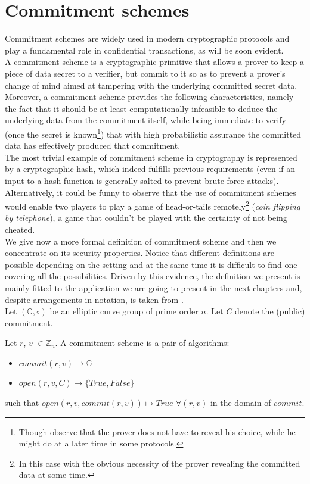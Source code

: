 \section{Commitment schemes}
\label{sect:commitment_schemes}
Commitment schemes are widely used in modern cryptographic protocols and play a fundamental role in confidential transactions, as will be soon evident.\\
A commitment scheme is a cryptographic primitive that allows a prover to keep a piece of data secret to a verifier, but commit to it so as to prevent a prover's change of mind aimed at tampering with the underlying committed secret data. Moreover, a commitment scheme provides the following characteristics, namely the fact that it should be at least computationally infeasible to deduce the underlying data from the commitment itself, while being immediate to verify (once the secret is known\footnote{Though observe that the prover does not have to reveal his choice, while he might do at a later time in some protocols.}) that with high probabilistic assurance the committed data has effectively produced that commitment.\\
The most trivial example of commitment scheme in cryptography is represented by a cryptographic hash, which indeed fulfills previous requirements (even if an input to a hash function is generally salted to prevent brute-force attacks). Alternatively, it could be funny to observe that the use of commitment schemes would enable two players to play a game of head-or-tails remotely\footnote{In this case with the obvious necessity of the prover revealing the committed data at some time.} (\textit{coin flipping by telephone}), a game that couldn't be played with the certainty of not being cheated.\\
We give now a more formal definition of commitment scheme and then we concentrate on its security properties. Notice that different definitions are possible depending on the setting and at the same time it is difficult to find one covering all the possibilities. Driven by this evidence, the definition we present is mainly fitted to the application we are going to present in the next chapters and, despite arrangements in notation, is taken from \cite{PoeMW}.\\
Let $(\mathbb{G}, \circ)$ be an elliptic curve group of prime order $n$. Let $C$ denote the (public) commitment.
\begin{mydef}
\label{commitement}
    Let $r$, $v$ $\in \mathbb{Z}_n$. A commitment scheme is a pair of algorithms: \begin{itemize}
        \item $commit(r,v) \rightarrow \mathbb{G}$
        \item $open(r,v,C) \rightarrow \{True, False\}$
    \end{itemize}
    such that $open(r,v,commit(r,v)) \mapsto True$ $\forall (r,v)$ in the domain of $commit$.
\end{mydef}
